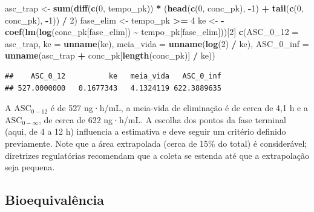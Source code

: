 \documentclass[
]{book}
\newenvironment{Shaded}{\begin{snugshade}}{\end{snugshade}}
\newcommand{\AttributeTok}[1]{\textcolor[rgb]{0.13,0.29,0.53}{#1}}
\newcommand{\DecValTok}[1]{\textcolor[rgb]{0.00,0.00,0.81}{#1}}
\newcommand{\FunctionTok}[1]{\textcolor[rgb]{0.13,0.29,0.53}{\textbf{#1}}}
\newcommand{\NormalTok}[1]{#1}
\newcommand{\OtherTok}[1]{\textcolor[rgb]{0.56,0.35,0.01}{#1}}
\newcommand{\SpecialCharTok}[1]{\textcolor[rgb]{0.81,0.36,0.00}{\textbf{#1}}}
\begin{document}
\begin{Shaded}
\begin{Highlighting}[]
\NormalTok{asc\_trap }\OtherTok{\textless{}{-}} \FunctionTok{sum}\NormalTok{(}\FunctionTok{diff}\NormalTok{(}\FunctionTok{c}\NormalTok{(}\DecValTok{0}\NormalTok{, tempo\_pk)) }\SpecialCharTok{*}\NormalTok{ (}\FunctionTok{head}\NormalTok{(}\FunctionTok{c}\NormalTok{(}\DecValTok{0}\NormalTok{, conc\_pk), }\SpecialCharTok{{-}}\DecValTok{1}\NormalTok{) }\SpecialCharTok{+} \FunctionTok{tail}\NormalTok{(}\FunctionTok{c}\NormalTok{(}\DecValTok{0}\NormalTok{, conc\_pk), }\SpecialCharTok{{-}}\DecValTok{1}\NormalTok{)) }\SpecialCharTok{/} \DecValTok{2}\NormalTok{)}
\NormalTok{fase\_elim }\OtherTok{\textless{}{-}}\NormalTok{ tempo\_pk }\SpecialCharTok{\textgreater{}=} \DecValTok{4}
\NormalTok{ke }\OtherTok{\textless{}{-}} \SpecialCharTok{{-}}\FunctionTok{coef}\NormalTok{(}\FunctionTok{lm}\NormalTok{(}\FunctionTok{log}\NormalTok{(conc\_pk[fase\_elim]) }\SpecialCharTok{\textasciitilde{}}\NormalTok{ tempo\_pk[fase\_elim]))[}\DecValTok{2}\NormalTok{]}
\FunctionTok{c}\NormalTok{(}\AttributeTok{ASC\_0\_12 =}\NormalTok{ asc\_trap, }\AttributeTok{ke =} \FunctionTok{unname}\NormalTok{(ke), }\AttributeTok{meia\_vida =} \FunctionTok{unname}\NormalTok{(}\FunctionTok{log}\NormalTok{(}\DecValTok{2}\NormalTok{) }\SpecialCharTok{/}\NormalTok{ ke),}
  \AttributeTok{ASC\_0\_inf =} \FunctionTok{unname}\NormalTok{(asc\_trap }\SpecialCharTok{+}\NormalTok{ conc\_pk[}\FunctionTok{length}\NormalTok{(conc\_pk)] }\SpecialCharTok{/}\NormalTok{ ke))}
\end{Highlighting}
\end{Shaded}

\begin{verbatim}
##    ASC_0_12          ke   meia_vida   ASC_0_inf 
## 527.0000000   0.1677343   4.1324119 622.3889635
\end{verbatim}

A \(\text{ASC}_{0-12}\) é de 527 ng·h/mL, a meia-vida de eliminação é de cerca de 4,1 h e a \(\text{ASC}_{0-\infty}\), de cerca de 622 ng·h/mL. A escolha dos pontos da fase terminal (aqui, de 4 a 12 h) influencia a estimativa e deve seguir um critério definido previamente. Note que a área extrapolada (cerca de 15\% do total) é considerável; diretrizes regulatórias recomendam que a coleta se estenda até que a extrapolação seja pequena.

\subsection{Bioequivalência}\label{bioequivaluxeancia}
\end{document}

